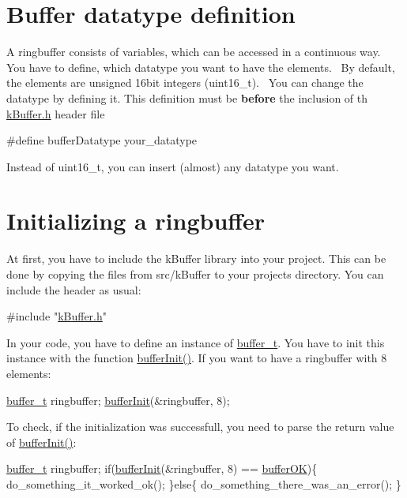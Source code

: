 \hypertarget{fundamental_usage_datatype}{}\section{Buffer datatype definition}\label{fundamental_usage_datatype}
A ringbuffer consists of variables, which can be accessed in a continuous way.~\newline
 You have to define, which datatype you want to have the elements.~\newline
 By default, the elements are unsigned 16bit integers (uint16\+\_\+t).~\newline
 You can change the datatype by defining it. This definition must be {\bfseries before} the inclusion of th \hyperlink{k_buffer_8h}{k\+Buffer.\+h} header file 
\begin{DoxyCode}
\textcolor{preprocessor}{#define bufferDatatype your\_datatype}
\end{DoxyCode}
 Instead of uint16\+\_\+t, you can insert (almost) any datatype you want. \hypertarget{fundamental_usage_init}{}\section{Initializing a ringbuffer}\label{fundamental_usage_init}
At first, you have to include the k\+Buffer library into your project. This can be done by copying the files from src/k\+Buffer to your project\textquotesingle{}s directory. You can include the header as usual\+: 
\begin{DoxyCode}
\textcolor{preprocessor}{#include "\hyperlink{k_buffer_8h}{kBuffer.h}"}
\end{DoxyCode}
 In your code, you have to define an instance of \hyperlink{structbuffer__t}{buffer\+\_\+t}. You have to init this instance with the function \hyperlink{k_buffer_8c_aec18d6ea571b1326dbeb7ca15f4969c0}{buffer\+Init()}. If you want to have a ringbuffer with 8 elements\+: 
\begin{DoxyCode}
\hyperlink{structbuffer__t}{buffer\_t} ringbuffer;
\hyperlink{k_buffer_8c_aec18d6ea571b1326dbeb7ca15f4969c0}{bufferInit}(&ringbuffer, 8);
\end{DoxyCode}
 To check, if the initialization was successfull, you need to parse the return value of \hyperlink{k_buffer_8c_aec18d6ea571b1326dbeb7ca15f4969c0}{buffer\+Init()}\+: 
\begin{DoxyCode}
\hyperlink{structbuffer__t}{buffer\_t} ringbuffer;
\textcolor{keywordflow}{if}(\hyperlink{k_buffer_8c_aec18d6ea571b1326dbeb7ca15f4969c0}{bufferInit}(&ringbuffer, 8) == \hyperlink{k_buffer_8h_a7a0bf550b7bd49d85172e409c0034fe6a69e32851bd2f089b06555decd80aac1b}{bufferOK})\{
 do\_something\_it\_worked\_ok();
\}\textcolor{keywordflow}{else}\{
 do\_something\_there\_was\_an\_error();
\}
\end{DoxyCode}
